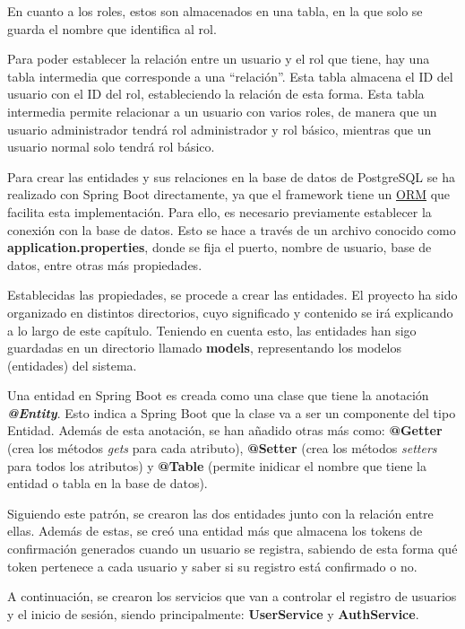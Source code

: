 En cuanto a los roles, estos son almacenados en una tabla, en la que solo se guarda el nombre que identifica al rol.

Para poder establecer la relación entre un usuario y el rol que tiene, hay una tabla intermedia que corresponde a una ``relación''. Esta tabla almacena el ID del usuario con el ID del rol, 
estableciendo la relación de esta forma. Esta tabla intermedia permite relacionar a un usuario con varios roles, de manera que un usuario administrador tendrá rol administrador y rol básico,
mientras que un usuario normal solo tendrá rol básico.

Para crear las entidades y sus relaciones en la base de datos de PostgreSQL se ha realizado con Spring Boot directamente, ya que el framework tiene un \hyperlink{orm}{ORM} que facilita esta
implementación. Para ello, es necesario previamente establecer la conexión con la base de datos. Esto se hace a través de un archivo conocido como \textbf{application.properties}, donde se fija
el puerto, nombre de usuario, base de datos, entre otras más propiedades.

Establecidas las propiedades, se procede a crear las entidades. El proyecto ha sido organizado en distintos directorios, cuyo significado y contenido se irá explicando a lo largo de este capítulo.
Teniendo en cuenta esto, las entidades han sigo guardadas en un directorio llamado \textbf{models}, representando los modelos (entidades) del sistema. 

Una entidad en Spring Boot es creada como una clase que tiene la anotación \textbf{\textit{@Entity}}. Esto indica a Spring Boot que la clase va a ser un componente del tipo Entidad. Además de esta
anotación, se han añadido otras más como: \textbf{@Getter} (crea los métodos \textit{gets} para cada atributo), \textbf{@Setter} (crea los métodos \textit{setters} para todos los atributos) y
\textbf{@Table} (permite inidicar el nombre que tiene la entidad o tabla en la base de datos).

Siguiendo este patrón, se crearon las dos entidades junto con la relación entre ellas. Además de estas, se creó una entidad más que almacena los tokens de confirmación generados cuando un usuario se 
registra, sabiendo de esta forma qué token pertenece a cada usuario y saber si su registro está confirmado o no.

A continuación, se crearon los servicios que van a controlar el registro de usuarios y el inicio de sesión, siendo principalmente: \textbf{UserService} y \textbf{AuthService}. 

